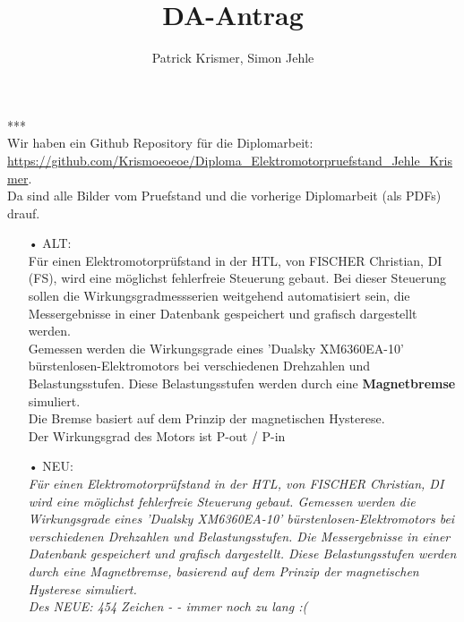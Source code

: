 \documentclass[12pt]{article}
\title{\textbf{\LARGE{DA-Antrag}}}
\author{Patrick Krismer, Simon Jehle}
\begin{document}
	\maketitle 
***\\
Wir haben ein  Github Repository für die Diplomarbeit:\\
 	\url{https://github.com/Krismoeoeoe/Diploma_Elektromotorpruefstand_Jehle_Krismer}. \\
	Da sind alle Bilder vom Pruefstand und die vorherige Diplomarbeit (als PDFs) drauf.\\
\begin{itemize}



\begin{figure}
	\centering
	\texttt{[image: Pruefstandplan\_1.png]}\\
	\textit{ Pruefstandplan 1 } konstruiert von Simon Jehle (supertyp)
\end{figure}




\subsection*{Ausgangslage bzw. Aufgabenstellung}
\item[•]ALT:\\
Für einen Elektromotorprüfstand in der HTL, von FISCHER Christian, DI (FS), wird eine möglichst fehlerfreie Steuerung gebaut. Bei dieser Steuerung sollen die Wirkungsgradmessserien weitgehend automatisiert sein, die Messergebnisse in einer Datenbank gespeichert und grafisch dargestellt werden.  \\
Gemessen werden die Wirkungsgrade eines 'Dualsky XM6360EA-10' bürstenlosen-Elektromotors bei verschiedenen Drehzahlen und Belastungsstufen. 
Diese Belastungsstufen werden durch eine \textbf{Magnetbremse} simuliert. \\ 
Die Bremse basiert auf dem Prinzip der magnetischen Hysterese. \\
Der Wirkungsgrad des Motors ist P-out / P-in\\

\item[•]NEU:\\
\textit{Für einen Elektromotorprüfstand in der HTL, von FISCHER Christian, DI wird eine möglichst fehlerfreie Steuerung gebaut. 
Gemessen werden die Wirkungsgrade eines 'Dualsky XM6360EA-10' bürstenlosen-Elektromotors bei verschiedenen Drehzahlen und Belastungsstufen. 
Die Messergebnisse in einer Datenbank gespeichert und grafisch dargestellt.
Diese Belastungsstufen werden durch eine Magnetbremse, basierend auf dem Prinzip der magnetischen Hysterese simuliert.\\
Des NEUE: 454 Zeichen - - immer noch zu lang :( }\\\\




\end{itemize}
\end{document}
